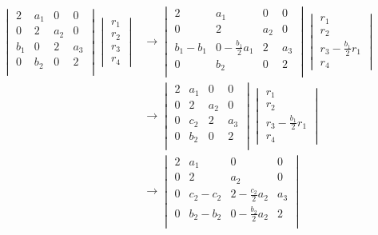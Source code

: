 \documentclass{article}
\begin{document}
\begin{align*}
    \begin{vmatrix}
    2 & a_{1} & 0 & 0   \\
    0 & 2 & a_{2} & 0   \\
    b_{1} & 0 & 2 & a_{3}  \\
    0 & b_{2} & 0& 2\\
    \end{vmatrix}
    \begin{vmatrix}
        r_{1} \\ r_{2}  \\ r_{3} \\ r_{4}
    \end{vmatrix} &\longrightarrow 
    \begin{vmatrix}
    2 & a_{1} & 0 & 0  \\
    0 & 2 & a_{2} & 0  \\
    b_{1} - b_{1} & 0 - \frac{b_{1}}{2}a_{1} & 2 & a_{3} \\
    0 & b_{2} & 0& 2\\
    \end{vmatrix}
    \begin{vmatrix}
        r_{1} \\ r_{2}  \\ r_{3} - \frac{b_{1}}{2}r_{1} \\ r_{4}
    \end{vmatrix}   \\[1mm]
    &\longrightarrow 
    \begin{vmatrix}
    2 & a_{1} & 0 & 0  \\
    0 & 2 & a_{2} & 0  \\
    0 & c_{2} & 2 & a_{3} \\
    0 & b_{2} & 0& 2\\
    \end{vmatrix}
    \begin{vmatrix}
        r_{1} \\ r_{2}  \\ r_{3} - \frac{b_{1}}{2}r_{1} \\ r_{4}
    \end{vmatrix} \\[1mm]
    &\longrightarrow 
    \begin{vmatrix}
    2 & a_{1} & 0 & 0  \\
    0 & 2 & a_{2} & 0  \\
    0 & c_{2} -c_{2} & 2-\frac{c_{2}}{2}a_{2} & a_{3}\\
    0 & b_{2}-b_{2} & 0 - \frac{b_{2}}{2}a_{2}& 2\\

\end{vmatrix}
\end{align*}
\end{document}
